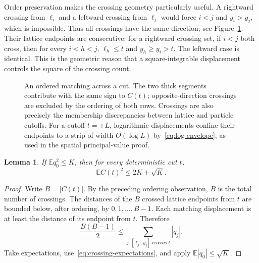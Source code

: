 \documentclass[11pt]{article}
\newtheorem{lemma}[theorem]{Lemma}
\theoremstyle{remark}\newtheorem{remark}[theorem]{Remark}
\newcommand{\E}{\mathbb E}
\begin{document}
Order preservation makes the crossing geometry particularly useful.
A rightward crossing from $\ell_i$ and a leftward crossing from
$\ell_j$ would force $i<j$ and $y_i>y_j$, which is impossible.
Thus all crossings have the same direction; see Figure~\ref{fig:crossings}.
Their lattice endpoints
are consecutive: for a rightward crossing set, if $i<j$ both cross,
then for every $i<h<j$, $\ell_h\le t$ and $y_h\ge y_i>t$.
The leftward case is identical. This is the geometric reason that
a square-integrable displacement controls the square of the crossing
count.

\begin{figure}[t]
\centering
{}
\caption{An ordered matching across a cut. The two thick segments
 contribute with the same sign to $C(t)$; opposite-direction
 crossings are excluded by the ordering of both rows. Crossings
 are also precisely the membership discrepancies between lattice
 and particle cutoffs. For a cutoff $t=\pm L$, logarithmic
 displacements confine their endpoints to a strip of width
 $O(\log L)$ by~\eqref{eq:log-envelope}, as used in the spatial
 principal-value proof.}
\label{fig:crossings}
\end{figure}

\begin{lemma}\label{lem:current}
If $\E q_0^2\le K$, then for every deterministic cut $t$,
\begin{equation}\label{eq:current-bound}
 \E C(t)^2\le 2K+\sqrt K.
\end{equation}
\end{lemma}
\begin{proof}
Write $B=|C(t)|$. By the preceding ordering observation, $B$ is
the total number of crossings. The distances of the $B$ crossed
lattice endpoints from $t$ are bounded below, after ordering, by
$0,1,\ldots,B-1$. Each matching displacement is at least the
distance of its endpoint from $t$. Therefore
\[
 \frac{B(B-1)}2
 \le\sum_{j:[\ell_j,y_j]\text{ crosses }t}|q_j|.
\]
Take expectations, use~\eqref{eq:crossing-expectations}, and apply
$\E|q_0|\le\sqrt K$.
\end{proof}
\end{document}
